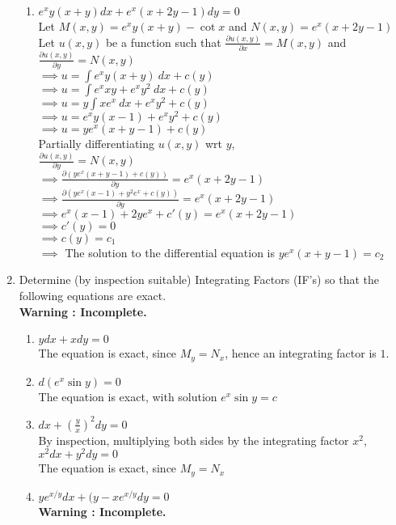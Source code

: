 \documentclass[a4paper]{article}
\begin{document}
\begin{enumerate}
{\begin{enumerate}
\item{$e^xy(x+y)dx+e^x(x+2y-1)dy=0$
\\Let $M(x,y)=e^xy(x+y) - \cot x$ and $N(x,y)=e^x(x+2y-1)$
\\Let $u(x,y)$ be a function such that $\frac{\partial u(x,y)}{\partial x}=M(x,y)$ and $\frac{\partial u(x,y)}{\partial y}=N(x,y)$
\\$\implies u=\int e^x y(x+y) \ dx +c(y)$
\\$\implies u=\int e^x xy + e^x y^2 \ dx +c(y)$
\\$\implies u=y\int xe^x \ dx + e^x y^2 +c(y)$
\\$\implies u=e^x y(x-1) + e^x y^2 +c(y)$
\\$\implies u=ye^x (x+y-1) +c(y)$
\\Partially differentiating $u(x,y)$ wrt $y$,
\\$\frac{\partial u(x,y)}{\partial y}=N(x,y)$
\\$\implies \frac{\partial (ye^x (x+y-1) +c(y))}{\partial y}=e^x(x+2y-1)$
\\$\implies \frac{\partial (ye^x (x-1) +y^2e^x +c(y))}{\partial y}=e^x(x+2y-1)$
\\$\implies e^x(x-1)+2ye^x +c'(y)= e^x(x+2y-1)$
\\$\implies c'(y)=0$
\\$\implies c(y)=c_1$
\\$\implies$ The solution to the differential equation is $ye^x (x+y-1)=c_2$
}
\end{enumerate}
}
\item{Determine (by inspection suitable) Integrating Factors (IF's) so that the following equations are exact. \\ \textbf{Warning : Incomplete.}
\begin{enumerate}
\item{$ydx+xdy=0$
\\The equation is exact, since $M_y=N_x$, hence an integrating factor is $1$.
}
\item{$d(e^x\sin y)=0$
\\The equation is exact, with solution $e^x\sin y=c$
}
\item{$dx+(\frac{y}{x})^2dy=0$
\\By inspection, multiplying both sides by the integrating factor $x^2$,
\\$x^2dx+y^2dy=0$
\\The equation is exact, since $M_y=N_x$
}
\item{$ye^{x/y}dx+(y-xe^{x/y}dy=0$
\\ \textbf{Warning : Incomplete.}
}
\end{enumerate}}
\end{enumerate}
\end{document}
